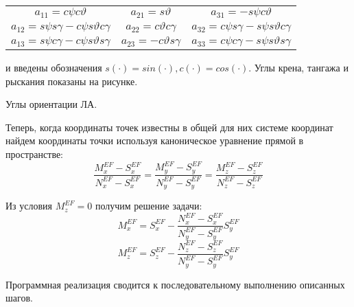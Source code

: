 \begin{tabular}{ccc}
    $a_{11}=c\psi c \vartheta$ & $a_{21}=s \vartheta$ & $a_{31}=-s\psi c \vartheta$ \\
    $a_{12}=s\psi s \gamma-c\psi s \vartheta c \gamma$ & $a_{22}=c \vartheta c \gamma$ & $a_{32}=c\psi s \gamma-s\psi s \vartheta c \gamma$ \\
    $a_{13}=s\psi c \gamma-c\psi s \vartheta s \gamma$ & $a_{23}=-c \vartheta s \gamma$ & $a_{33}=c\psi c \gamma-s\psi s \vartheta s \gamma$ \\
\end{tabular}

\noindent и введены обозначения $s(\cdot)=sin(\cdot), c(\cdot)=cos(\cdot)$. Углы крена, тангажа и рыскания показаны на рисунке.


\begin{center}
    Углы ориентации ЛА.    
\end{center}

Теперь, когда координаты точек известны в общей для них системе координат найдем координаты 
точки используя каноническое уравнение прямой в пространстве:
$$\frac{M_x^{EF}-S_x^{EF}}{N_x^{EF}-S_x^{EF}}=\frac{M_y^{EF}-S_y^{EF}}{N_y^{EF}-S_y^{EF}}=\frac{M_z^{EF}-S_z^{EF}}{N_z^{EF}-S_z^{EF}}$$

Из условия $M_z^{EF}=0$ получим решение задачи:
$$M_x^{EF}=S_x^{EF}-\frac{N_x^{EF}-S_x^{EF}}{N_y^{EF}-S_y^{EF}} S_y^{EF}$$
$$M_z^{EF}=S_z^{EF}-\frac{N_z^{EF}-S_z^{EF}}{N_y^{EF}-S_y^{EF}} S_y^{EF}$$

Программная реализация сводится к последовательному выполнению описанных шагов.

